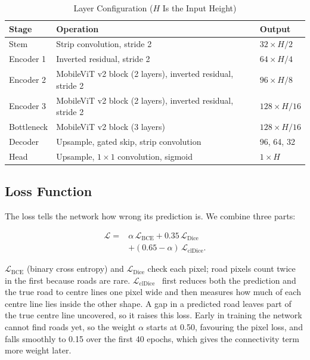 \documentclass{ieeeaccess}
\begin{document}
\begin{table}[t]
\caption{Layer Configuration ($H$ Is the Input Height)}
\label{tab:layers}
\setlength{\tabcolsep}{3pt}
\tablebodyfont
\begin{tabular}{|p{48pt}|p{120pt}|p{50pt}|}
\hline
Stage & Operation & Output \\
\hline
Stem & Strip convolution, stride 2 & $32 \times H/2$ \\
Encoder 1 & Inverted residual, stride 2 & $64 \times H/4$ \\
Encoder 2 & MobileViT v2 block (2 layers), inverted residual, stride 2 & $96 \times H/8$ \\
Encoder 3 & MobileViT v2 block (2 layers), inverted residual, stride 2 & $128 \times H/16$ \\
Bottleneck & MobileViT v2 block (3 layers) & $128 \times H/16$ \\
Decoder & Upsample, gated skip, strip convolution & 96, 64, 32 \\
Head & Upsample, $1 \times 1$ convolution, sigmoid & $1 \times H$ \\
\hline
\end{tabular}
\end{table}

\subsection{Loss Function}

The loss tells the network how wrong its prediction is. We combine three parts:

\begin{equation}
\begin{split}
\mathcal{L} ={}& \alpha\,\mathcal{L}_{\mathrm{BCE}} + 0.35\,\mathcal{L}_{\mathrm{Dice}}\\
&+ (0.65 - \alpha)\,\mathcal{L}_{\mathrm{clDice}}.
\end{split}
\label{eq:loss}
\end{equation}

$\mathcal{L}_{\mathrm{BCE}}$ (binary cross entropy) and $\mathcal{L}_{\mathrm{Dice}}$ check each pixel; road pixels count twice in the first because roads are rare. $\mathcal{L}_{\mathrm{clDice}}$~\cite{shit2021cldice} first reduces both the prediction and the true road to centre lines one pixel wide and then measures how much of each centre line lies inside the other shape. A gap in a predicted road leaves part of the true centre line uncovered, so it raises this loss. Early in training the network cannot find roads yet, so the weight $\alpha$ starts at 0.50, favouring the pixel loss, and falls smoothly to 0.15 over the first 40 epochs, which gives the connectivity term more weight later.
\end{document}
